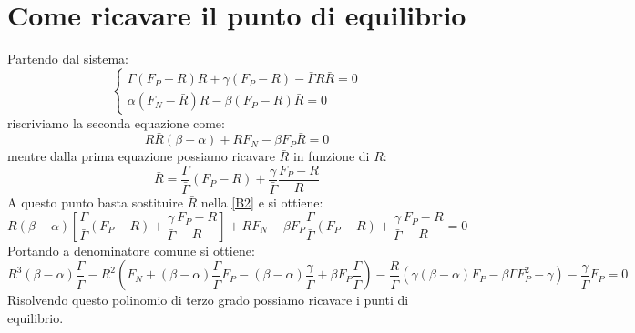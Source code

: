\section{Come ricavare il punto di equilibrio}
Partendo dal sistema:
\begin{equation}
	\begin{cases}
		\Gamma (F_{P}-R)R+\gamma (F_{P}-R)-\bar{\Gamma}R\bar{R}=0\\
		\alpha (F_{N}-\bar{R})R-\beta (F_{P}-R)\bar{R}=0
	\end{cases}
\end{equation}
riscriviamo la seconda equazione come:
\begin{equation} \label{B2}
	R\bar{R}(\beta - \alpha)+RF_{N}-\beta F_{P}\bar{R}=0
\end{equation}
mentre dalla prima equazione possiamo ricavare $ \bar{R} $ in funzione di $ R $:
\begin{equation}
	\bar{R}=\frac{\Gamma}{\bar{\Gamma}}(F_{P}-R)+\frac{\gamma}{\bar{\Gamma}}\frac{F_{P}-R}{R}
\end{equation}
A questo punto basta sostituire $\bar{R} $ nella \ref{B2} e si ottiene:
\begin{equation}
	R(\beta - \alpha)\left[\frac{\Gamma}{\bar{\Gamma}}(F_{P}-R)+\frac{\gamma}{\bar{\Gamma}}\frac{F_{P}-R}{R}\right]+RF_{N}-\beta F_{P}\frac{\Gamma}{\bar{\Gamma}}(F_{P}-R)+\frac{\gamma}{\bar{\Gamma}}\frac{F_{P}-R}{R}=0
\end{equation} 
Portando a denominatore comune si ottiene:
\begin{equation}
	R^{3}(\beta - \alpha)\frac{\Gamma}{\bar{\Gamma}}-R^{2}\left(F_{N}+(\beta - \alpha)\frac{\Gamma}{\bar{\Gamma}}F_{P}-(\beta - \alpha)\frac{\gamma}{\bar{\Gamma}}+\beta F_{P}\frac{\Gamma}{\bar{\Gamma}}\right)-\frac{R}{\bar{\Gamma}}\left(\gamma (\beta - \alpha)F_{P}-\beta \Gamma F^{2}_{P}-\gamma\right)-\frac{\gamma}{\bar{\Gamma}}F_{P}=0
\end{equation}
Risolvendo questo polinomio di terzo grado possiamo ricavare i punti di equilibrio.